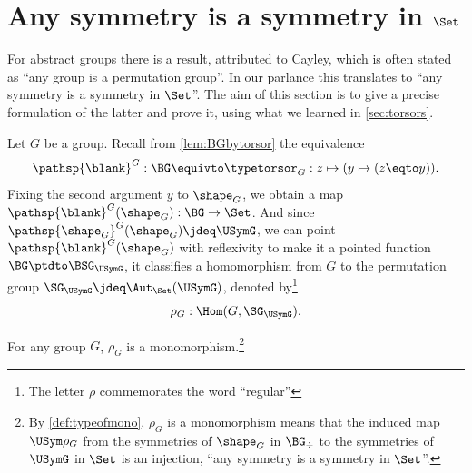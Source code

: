 \section{Any symmetry is a symmetry in $\Set$}
\label{sec:groupssubperm}


For abstract groups there is a result, attributed to Cayley, which is often
stated as ``any group is a permutation group''.  In our parlance this translates
to ``any symmetry is a symmetry in $\Set$''.  The aim of this section is to give
a precise formulation of the latter and prove it, using what we learned in
\cref{sec:torsors}.

Let $G$ be a group. Recall from \cref{lem:BGbytorsor} the equivalence
\begin{displaymath}
  \pathsp{\blank}^G:\BG\equivto\typetorsor_G : 
  z \mapsto (y \mapsto (z \eqto y)).
\end{displaymath}
Fixing the second argument $y$ to $\sh_G$, we obtain a map
$\pathsp{\blank}^G(\sh_G):\BG\to\Set$. And since
$\pathsp{\sh_G}^G(\sh_G)\jdeq \USymG$, we can point $\pathsp{\blank}^G(\sh_G)$
with reflexivity to make it a pointed function $\BG\ptdto \BSG_{\USymG}$, \ie it
classifies a homomorphism from $G$ to the permutation group
$\SG_{\USymG}\jdeq \Aut_{\Set}(\USymG)$, denoted by\footnote{The letter $\rho$
  commemorates the word ``regular''}
\begin{displaymath}
  \rho_G:\Hom(G,\SG_{\USymG}).
\end{displaymath}

\begin{theorem}[Cayley]
  \label{lem:allgpsarepermutationgps}
  For any group $G$, $\rho_G$ is a monomorphism.\footnote{By
    \cref{def:typeofmono}, $\rho_G$ is a monomorphism means that the induced map
    $\USym\rho_G$ from the symmetries of $\sh_G$ in $\BG_\div$ to the symmetries
    of $\USymG$ in $\Set$ is an injection, \ie ``any symmetry is a symmetry in
    $\Set$''.}
\end{theorem}

